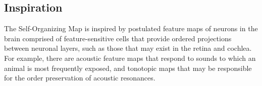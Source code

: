 \subsection{Inspiration}
The Self-Organizing Map is inspired by postulated feature maps of neurons in the brain comprised of feature-sensitive cells that provide ordered projections between neuronal layers, such as those that may exist in the retina and cochlea. For example, there are acoustic feature maps that respond to sounds to which an animal is most frequently exposed, and tonotopic maps that may be responsible for the order preservation of acoustic resonances.


